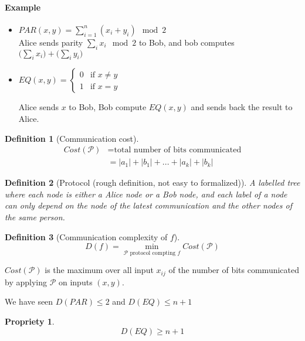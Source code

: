 \documentclass{article}
\newtheorem{prop}{Propriety}
\newtheorem{defi}{Definition}
\begin{document}
\paragraph{Example}
\begin{itemize}
\item $PAR(x,y)=\sum_{i=1}^n (x_i+y_i) \mod 2$\\
Alice sends parity $\sum_i x_i \mod 2$ to Bob, and bob computes $\Big( \sum_i x_i \Big) + \Big( \sum_i y_i \Big)$
\item $EQ(x,y)=
\begin{cases}
0 & \text{if } x\neq y\\
1 & \text{if } x= y
\end{cases}$

Alice sends $x$ to Bob, Bob compute $EQ(x,y)$ and sends back the result to Alice.
\end{itemize}

\begin{defi}[Communication cost]
\begin{align*}
Cost(\mathcal{P}) & = \text{total number of bits communicated}\\
& = |a_1|+|b_1|+...+|a_k|+|b_k| \tag{Worst case over all input $x,y$}
\end{align*}

\end{defi}

\begin{defi}[Protocol (rough definition, not easy to formalized)]
A labelled tree where each node is either a Alice node or a Bob node, and each label of a node can only depend on the node of the latest communication and the other nodes of the same person.
\end{defi}


\begin{defi}[Communication complexity of $f$]
\[D(f)=\min_{\mathcal{P}\text{ protocol compting } f} Cost( \mathcal{P}) \]
\end{defi}

$Cost(\mathcal{P})$ is the maximum over all input $x_{ij}$ of the number of bits communicated by applying $\mathcal{P}$ on inputs $(x,y)$.

We have seen $D(PAR)\leq 2$ and $D(EQ) \leq n+1$

\begin{prop}
\[D(EQ)\geq n+1\]
\end{prop}
\end{document}
